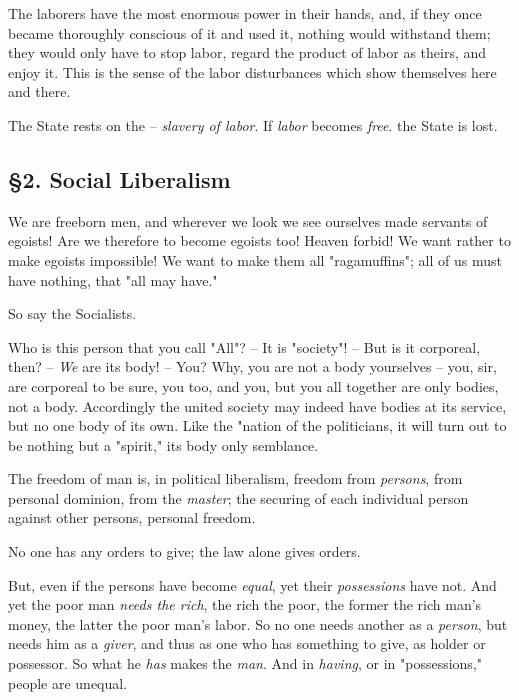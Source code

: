 \documentclass[a4paper]{book}
\begin{document}
The laborers have the most enormous power in their hands, and, if they once 
became thoroughly conscious of it and used it, nothing would withstand them; 
they would only have to stop labor, regard the product of labor as theirs, and 
enjoy it. This is the sense of the labor disturbances which show themselves 
here and there.

The State rests on the -- \textit{slavery of labor}. If \textit{labor} becomes 
\textit{free}. the State is lost.

\subsection[\S{}2. Social Liberalism]{\centering \S{}2. Social Liberalism}

We are freeborn men, and wherever we look we see ourselves made servants of 
egoists! Are we therefore to become egoists too! Heaven forbid! We want rather 
to make egoists impossible! We want to make them all "{}ragamuffins"{}; all of 
us must have nothing, that "{}all may have."{}

So say the Socialists.

Who is this person that you call "{}All"{}? -- It is "{}society"{}! -- But is 
it corporeal, then? -- \textit{We} are its body! -- You? Why, you are not a 
body yourselves -- you, sir, are corporeal to be sure, you too, and you, but 
you all together are only bodies, not a body. Accordingly the united society 
may indeed have bodies at its service, but no one body of its own. Like the 
"{}nation of the politicians, it will turn out to be nothing but a 
"{}spirit,"{} its body only semblance.

The freedom of man is, in political liberalism, freedom from \textit{persons}, 
from personal dominion, from the \textit{master}; the securing of each 
individual person against other persons, personal freedom.

No one has any orders to give; the law alone gives orders.

But, even if the persons have become \textit{equal}, yet their 
\textit{possessions} have not. And yet the poor man \textit{needs the rich}, 
the rich the poor, the former the rich man's money, the latter the poor man's 
labor. So no one needs another as a \textit{person}, but needs him as a 
\textit{giver}, and thus as one who has something to give, as holder or 
possessor. So what he \textit{has} makes the \textit{man}. And in 
\textit{having}, or in "{}possessions,"{} people are unequal.
\end{document}
